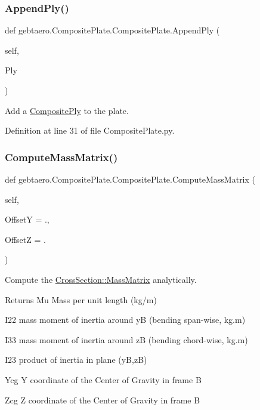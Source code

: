 \subsubsection{\texorpdfstring{Append\+Ply()}{AppendPly()}}
{\footnotesize\ttfamily def gebtaero.\+Composite\+Plate.\+Composite\+Plate.\+Append\+Ply (\begin{DoxyParamCaption}\item[{}]{self,  }\item[{}]{Ply }\end{DoxyParamCaption})}



Add a \hyperlink{namespacegebtaero_1_1_composite_ply}{Composite\+Ply} to the plate. 



Definition at line 31 of file Composite\+Plate.\+py.

\mbox{\label{classgebtaero_1_1_composite_plate_1_1_composite_plate_a13b1222bb715056417c9db9903d264a2}} 
\subsubsection{\texorpdfstring{Compute\+Mass\+Matrix()}{ComputeMassMatrix()}}
{\footnotesize\ttfamily def gebtaero.\+Composite\+Plate.\+Composite\+Plate.\+Compute\+Mass\+Matrix (\begin{DoxyParamCaption}\item[{}]{self,  }\item[{}]{OffsetY = {.},  }\item[{}]{OffsetZ = {.} }\end{DoxyParamCaption})}



Compute the \hyperlink{classgebtaero_1_1_cross_section_1_1_cross_section_ae9be8649853163b2b4dfdaa3584d9f78}{Cross\+Section\+::\+Mass\+Matrix} analytically. 

\begin{DoxyReturn}{Returns}
Mu Mass per unit length (kg/m) 

I22 mass moment of inertia around yB (bending span-\/wise, kg.\+m) 

I33 mass moment of inertia around zB (bending chord-\/wise, kg.\+m) 

I23 product of inertia in plane (yB,zB) 

Ycg Y coordinate of the Center of Gravity in frame B 

Zcg Z coordinate of the Center of Gravity in frame B 
\end{DoxyReturn}


